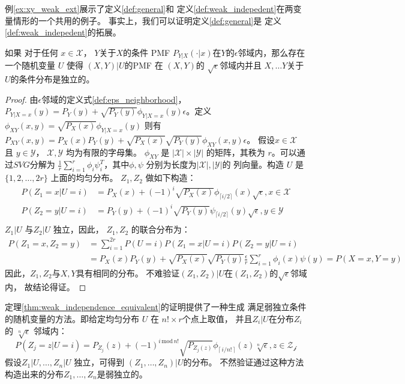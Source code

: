 例\ref{ex:xy_weak_ext}展示了定义\ref{def:general}和
定义\ref{def:weak_indepedent}在两变量情形的一个共用的例子。
事实上，我们可以证明定义\ref{def:general}是
定义\ref{def:weak_indepedent}的拓展。
\begin{theorem}\label{thm:weak_independence_equivalent}
  如果 对于任何 $x \in \mathcal{X}$，
$Y$关于$X$的条件 PMF 
$P_{Y|X}(\cdot |x)$在$Y$的$\epsilon$邻域内，那么存在
一个随机变量 $U$
  使得
  $(X, Y)|U$的PMF 在 $(X, Y)$的
  $\sqrt{\epsilon}$邻域内并且
  $X, \dots Y$关于
  $U$的条件分布是独立的。
\end{theorem}
\begin{proof}
  由$\epsilon$邻域的定义式\ref{def:eps_neighborhood}，
  $P_{Y|X=x}(y) = P_Y(y) + \sqrt{P_Y(y)}\phi_{Y|X=x}(y)
  \epsilon$。定义$\phi_{XY}(x,y)=\sqrt{P_X(x)}\phi_{Y|X=x}(y)$
  则有
  $P_{XY}(x,y) = P_X(x)P_Y(y) + \sqrt{P_X(x)}\sqrt{P_Y(y)}\phi_{XY}(x,y)
  \epsilon$。
  假设$x\in \mathcal{X}$ 且 $y\in \mathcal{Y}$，
  $\mathcal{X}, \mathcal{Y}$ 均为有限的字母集。
  $\phi_{XY}$ 是 $|\mathcal{X}| \times |\mathcal{Y}|$
  的矩阵，其秩为 $r$。可以通过$SVG$分解为
  $\frac{1}{r}\sum_{i=1}^r \phi_i \psi^T_i$，其中$\phi, \psi$
  分别为长度为$|\mathcal{X}|, |\mathcal{Y}|$的
  列向量。构造 $U$ 是$\{1, 2, \dots, 2r\}$ 上面的均匀分布。
  $Z_1, Z_2$ 做如下构造：
  \begin{align*}
    P(Z_1=x|U=i) &= P_X(x) + (-1)^i\sqrt{P_X(x)}\phi_{\lceil i/2 \rceil}(x) \sqrt{\epsilon}, x \in \mathcal{X} \\
    P(Z_2=y|U=i) &= P_Y(y) + (-1)^i\sqrt{P_Y(y)}\psi_{\lceil i/2 \rceil}(y) \sqrt{\epsilon}, y \in \mathcal{Y}\\
  \end{align*}
  $Z_1 | U$ 与$Z_2 | U$ 独立，因此，
  $Z_1, Z_2$ 的联合分布为：
  \begin{align*}
  P(Z_1=x, Z_2=y)& =\sum_{i=1}^{2r}P(U=i)P(Z_1=x|U=i)P(Z_2=y|U=i)\\
  &=P_X(x)P_Y(y) + \sqrt{P_X(x)}\sqrt{P_Y(y)}\frac{\epsilon}{r}
  \sum_{i=1}^{r}\phi_i(x)
  \psi(y) =P(X=x,Y=y)
  \end{align*}
  因此，$Z_1, Z_2$与$X,Y$具有相同的分布。
  不难验证$(Z_1, Z_2)|U$在$(Z_1, Z_2)$的$\sqrt{\epsilon}$邻域内，
  故结论得证。
  \end{proof}
  定理\ref{thm:weak_independence_equivalent}的证明提供了一种生成
  满足弱独立条件的随机变量的方法。即给定均匀分布
  $U$ 在 $n! \times r$个点上取值，
  并且$Z_i|U$在分布$Z_i$的
  $\sqrt[n]{\epsilon}$ 邻域内：
  \begin{equation}
    P(Z_j=z|U=i) = P_{Z_j}(z) + 
    (-1)^{i \,\mathrm{mod}\, n!}\sqrt{P_{Z_j(z)}}
    \phi_{\lceil\, i/n!\, \rceil}(z) \sqrt[n]{\epsilon}, z \in \mathcal{Z_j}
  \end{equation}
  假设$Z_1|U, \dots, Z_n|U$ 独立，可得到
  $(Z_1, \dots, Z_n)|U$的分布。
  不然验证通过这种方法构造出来的分布$Z_1, \dots, Z_n$是弱独立的。

